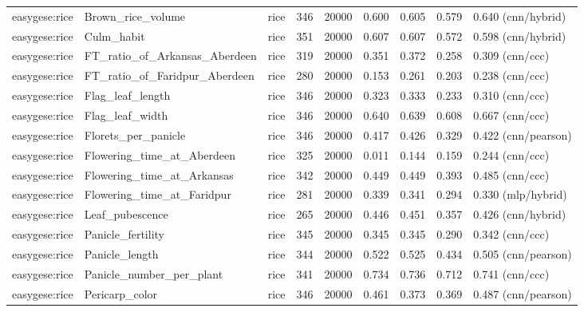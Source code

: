 \begin{longtable}{@{}p{2.25cm}p{1.35cm}p{1.85cm}rrcccp{2.7cm}@{}}
easygese:rice & Brown\_\allowbreak{}rice\_\allowbreak{}volume & rice & 346 & 20000 & 0.600 & 0.605 & 0.579 & 0.640 (cnn/hybrid) \\
easygese:rice & Culm\_\allowbreak{}habit & rice & 351 & 20000 & 0.607 & 0.607 & 0.572 & 0.598 (cnn/hybrid) \\
easygese:rice & FT\_\allowbreak{}ratio\_\allowbreak{}of\_\allowbreak{}Arkansas\_\allowbreak{}Aberdeen & rice & 319 & 20000 & 0.351 & 0.372 & 0.258 & 0.309 (cnn/ccc) \\
easygese:rice & FT\_\allowbreak{}ratio\_\allowbreak{}of\_\allowbreak{}Faridpur\_\allowbreak{}Aberdeen & rice & 280 & 20000 & 0.153 & 0.261 & 0.203 & 0.238 (cnn/ccc) \\
easygese:rice & Flag\_\allowbreak{}leaf\_\allowbreak{}length & rice & 346 & 20000 & 0.323 & 0.333 & 0.233 & 0.310 (cnn/ccc) \\
easygese:rice & Flag\_\allowbreak{}leaf\_\allowbreak{}width & rice & 346 & 20000 & 0.640 & 0.639 & 0.608 & 0.667 (cnn/ccc) \\
easygese:rice & Florets\_\allowbreak{}per\_\allowbreak{}panicle & rice & 346 & 20000 & 0.417 & 0.426 & 0.329 & 0.422 (cnn/pearson) \\
easygese:rice & Flowering\_\allowbreak{}time\_\allowbreak{}at\_\allowbreak{}Aberdeen & rice & 325 & 20000 & 0.011 & 0.144 & 0.159 & 0.244 (cnn/ccc) \\
easygese:rice & Flowering\_\allowbreak{}time\_\allowbreak{}at\_\allowbreak{}Arkansas & rice & 342 & 20000 & 0.449 & 0.449 & 0.393 & 0.485 (cnn/ccc) \\
easygese:rice & Flowering\_\allowbreak{}time\_\allowbreak{}at\_\allowbreak{}Faridpur & rice & 281 & 20000 & 0.339 & 0.341 & 0.294 & 0.330 (mlp/hybrid) \\
easygese:rice & Leaf\_\allowbreak{}pubescence & rice & 265 & 20000 & 0.446 & 0.451 & 0.357 & 0.426 (cnn/hybrid) \\
easygese:rice & Panicle\_\allowbreak{}fertility & rice & 345 & 20000 & 0.345 & 0.345 & 0.290 & 0.342 (cnn/ccc) \\
easygese:rice & Panicle\_\allowbreak{}length & rice & 344 & 20000 & 0.522 & 0.525 & 0.434 & 0.505 (cnn/pearson) \\
easygese:rice & Panicle\_\allowbreak{}number\_\allowbreak{}per\_\allowbreak{}plant & rice & 341 & 20000 & 0.734 & 0.736 & 0.712 & 0.741 (cnn/ccc) \\
easygese:rice & Pericarp\_\allowbreak{}color & rice & 346 & 20000 & 0.461 & 0.373 & 0.369 & 0.487 (cnn/pearson) \\

\end{longtable}
